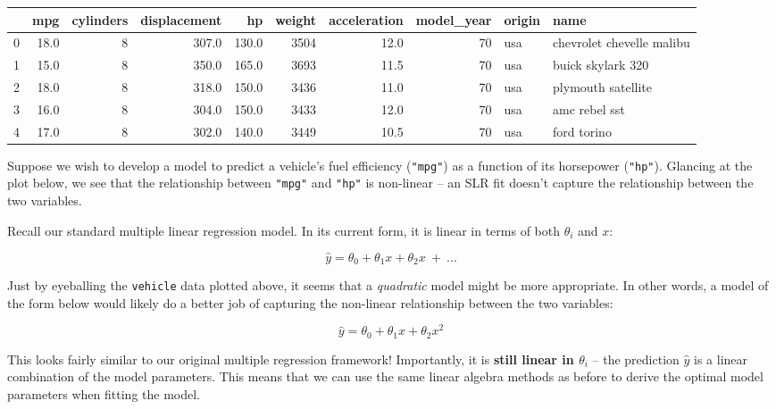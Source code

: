 \documentclass[
  letterpaper,
  DIV=11,
  numbers=noendperiod]{scrreprt}
\begin{document}
\begin{tabular}{lrrrrrrrll}
\toprule
{} &   mpg &  cylinders &  displacement &     hp &  weight &  acceleration &  model\_year & origin &                       name \\
\midrule
0 &  18.0 &          8 &         307.0 &  130.0 &    3504 &          12.0 &          70 &    usa &  chevrolet chevelle malibu \\
1 &  15.0 &          8 &         350.0 &  165.0 &    3693 &          11.5 &          70 &    usa &          buick skylark 320 \\
2 &  18.0 &          8 &         318.0 &  150.0 &    3436 &          11.0 &          70 &    usa &         plymouth satellite \\
3 &  16.0 &          8 &         304.0 &  150.0 &    3433 &          12.0 &          70 &    usa &              amc rebel sst \\
4 &  17.0 &          8 &         302.0 &  140.0 &    3449 &          10.5 &          70 &    usa &                ford torino \\
\bottomrule
\end{tabular}

Suppose we wish to develop a model to predict a vehicle's fuel
efficiency (\texttt{"mpg"}) as a function of its horsepower
(\texttt{"hp"}). Glancing at the plot below, we see that the
relationship between \texttt{"mpg"} and \texttt{"hp"} is non-linear --
an SLR fit doesn't capture the relationship between the two variables.

Recall our standard multiple linear regression model. In its current
form, it is linear in terms of both \(\theta_i\) and \(x\):

\[\hat{y} = \theta_0 + \theta_1 x + \theta_2 x\:+\:...\]

Just by eyeballing the \texttt{vehicle} data plotted above, it seems
that a \emph{quadratic} model might be more appropriate. In other words,
a model of the form below would likely do a better job of capturing the
non-linear relationship between the two variables:

\[\hat{y} = \theta_0 + \theta_1 x + \theta_2 x^2\]

This looks fairly similar to our original multiple regression framework!
Importantly, it is \textbf{still linear in \(\theta_i\)} -- the
prediction \(\hat{y}\) is a linear combination of the model parameters.
This means that we can use the same linear algebra methods as before to
derive the optimal model parameters when fitting the model.
\end{document}
